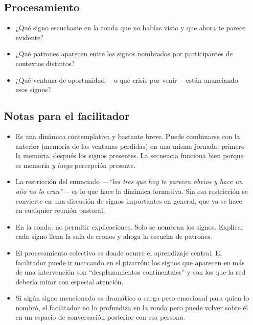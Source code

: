 \documentclass[11pt, a4paper]{article}
\begin{document}
\begin{actividad}
\subsection*{Procesamiento}
\begin{itemize}
  \item ¿Qué signo escuchaste en la ronda que no habías visto y que ahora te parece evidente?
  \item ¿Qué patrones aparecen entre los signos nombrados por participantes de contextos distintos?
  \item ¿Qué ventana de oportunidad ---o qué crisis por venir--- están anunciando esos signos?
\end{itemize}

\subsection*{Notas para el facilitador}
\begin{itemize}
  \item Es una dinámica contemplativa y bastante breve. Puede combinarse con la anterior (memoria de las ventanas perdidas) en una misma jornada: primero la memoria, después los signos presentes. La secuencia funciona bien porque es memoria \emph{y luego} percepción presente.
  \item La restricción del enunciado ---\emph{``los tres que hoy te parecen obvios y hace un año no lo eran''}--- es lo que hace la dinámica formativa. Sin esa restricción se convierte en una discusión de signos importantes en general, que ya se hace en cualquier reunión pastoral.
  \item En la ronda, no permitir explicaciones. Solo se nombran los signos. Explicar cada signo llena la sala de cronos y ahoga la escucha de patrones.
  \item El procesamiento colectivo es donde ocurre el aprendizaje central. El facilitador puede ir marcando en el pizarrón: los signos que aparecen en más de una intervención son ``desplazamientos continentales'' y son los que la red debería mirar con especial atención.
  \item Si algún signo mencionado es dramático o carga peso emocional para quien lo nombró, el facilitador no lo profundiza en la ronda pero puede volver sobre él en un espacio de conversación posterior con esa persona.
\end{itemize}

\end{actividad}

\newpage
\end{document}
